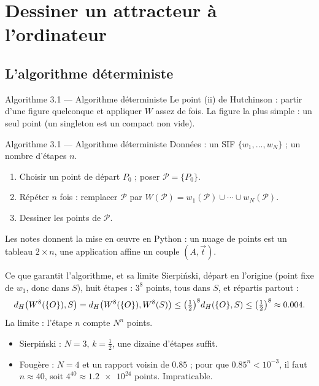 \section{Dessiner un attracteur à l'ordinateur}

\subsection{L'algorithme déterministe}

\begin{frame}{Algorithme 3.1 --- Algorithme déterministe}
  \small Le point (ii) de Hutchinson : partir d'une figure quelconque et
  appliquer $W$ assez de fois. La figure la plus simple : un seul point
  (un singleton est un compact non vide).
  \begin{Algo}{Algorithme 3.1 --- Algorithme déterministe}
    Données : un SIF $\{w_1,\dots,w_N\}$ ; un nombre d'étapes $n$.
    \begin{enumerate}
      \item Choisir un point de départ $P_0$ ; poser $\mathcal P=\{P_0\}$.
      \item Répéter $n$ fois : remplacer $\mathcal P$ par
        $W(\mathcal P)=w_1(\mathcal P)\cup\cdots\cup w_N(\mathcal P)$.
      \item Dessiner les points de $\mathcal P$.
    \end{enumerate}
  \end{Algo}
  \small Les notes donnent la mise en œuvre en Python : un nuage de
  points est un tableau $2\times n$, une application affine un couple
  $(A,\vec t)$.
\end{frame}

\begin{frame}{Ce que garantit l'algorithme, et sa limite}
  \small Sierpiński, départ en l'origine (point fixe de $w_1$, donc dans
  $S$), huit étapes : $3^8$ points, tous dans $S$, et répartis partout :
  \[
    d_H\big(W^8(\{O\}),S\big) = d_H\big(W^8(\{O\}),W^8(S)\big)
    \leq \big(\tfrac12\big)^8d_H(\{O\},S) \leq \big(\tfrac12\big)^8
    \approx \num{0.004}.
  \]
  La limite : l'étape $n$ compte $N^n$ points.
  \begin{itemize}
    \item Sierpiński : $N=3$, $k=\tfrac12$, une dizaine d'étapes suffit.
    \item Fougère : $N=4$ et un rapport voisin de $\num{0.85}$ ; pour que
      $\num{0.85}^n<10^{-3}$, il faut $n\approx40$, soit
      $4^{40}\approx\num{1.2e24}$ points. Impraticable.
  \end{itemize}
\end{frame}

